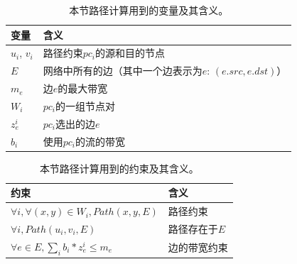 \begin{table}[ht]
\centering
\begin{tabular}{l|l}
\hline
变量     & 含义                                                             \\ \hline
$u_i$, $v_i$ & 路径约束$pc_i$的源和目的节点                            \\ 
$E$          & 网络中所有的边（其中一个边表示为$e$: $(e.src, e.dst)$）                       \\
$m_e$        & 边$e$的最大带宽                                            \\
$W_i$        &  $pc_i$的一组节点对\\
$z^i_e$      &  $pc_i$选出的边$e$\\
$b_i$          & 使用$pc_i$的流的带宽\\
\hline
\end{tabular}
\caption{本节路径计算用到的变量及其含义。}
\label{table:variables}
\end{table}


\begin{table}[ht]
\centering
\begin{tabular}{l|l}
\hline
约束                                        & 含义                               \\ \hline
$\forall i, \forall (x, y) \in W_i, Path(x, y, E)$                    & 路径约束                  \\
$\forall i, Path(u_i, v_i, E)$      & 路径存在于$E$     \\
$\forall e \in E, \sum_ib_i*z^i_e \le m_e$   & 边的带宽约束\\
\hline
\end{tabular}
\caption{本节路径计算用到的约束及其含义。}
\label{table:constraints}
\end{table}

